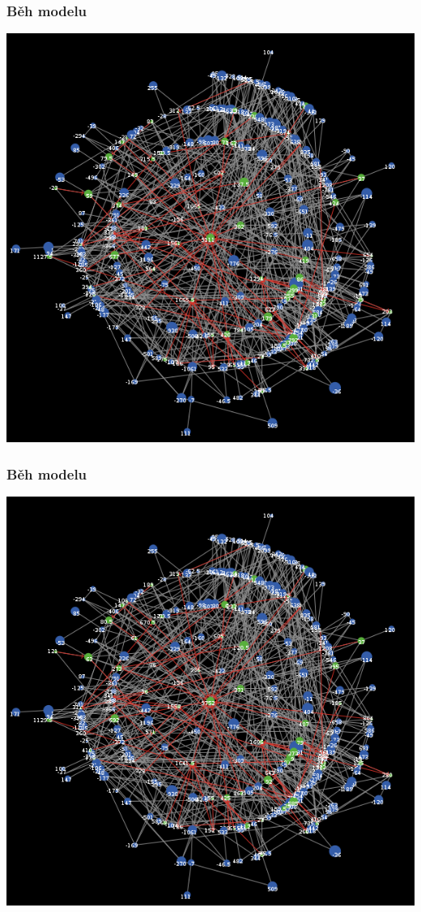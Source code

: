 \documentclass[xcolor=dvipsnames]{beamer}
\begin{document}
  \begin{frame}
    \frametitle{Běh modelu}
    \includegraphics[width=0.6\paperwidth]{20.png}
  \end{frame}
  \begin{frame}
    \frametitle{Běh modelu}
    \includegraphics[width=0.6\paperwidth]{21.png}
  \end{frame}
\end{document}
